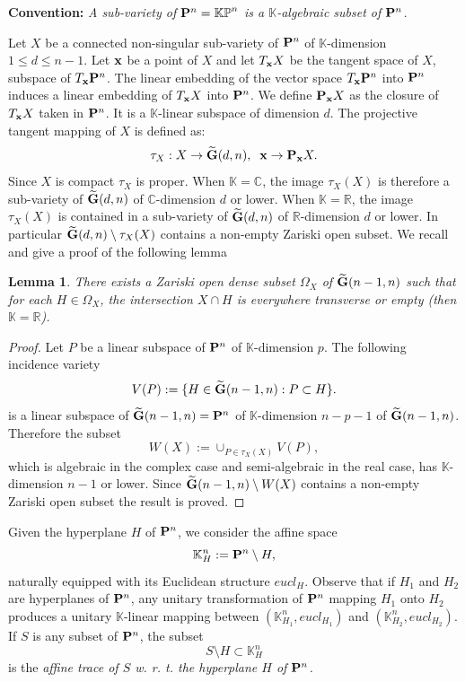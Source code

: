 \documentclass[11pt]{amsart}
\newtheorem{lemma}[theorem]{Lemma}
\newcommand{\field}[1]{\mathbb{#1}}
\newcommand{\C}{\field{C}}
\newcommand{\K}{\field{K}}
\newcommand{\R}{\field{R}}
\newcommand{\wt}[1]{\widetilde{#1}}
\newcommand{\bG}{{\bf G}}
\newcommand{\bP}{{\bf P}}
\newcommand{\bx}{{\bf x}}
\numberwithin{equation}{section}
\numberwithin{equation}{section}
\begin{document}
\bigskip\noindent
{\bf Convention:} \em A sub-variety of $\bP^n = \field{KP}^n$ is a 
$\K$-algebraic subset of $\bP^n$. 
\em

\bigskip
Let $X$ be a connected non-singular sub-variety of $\bP^n$ of $\K$-dimension
$1\leq d\leq n-1$. Let $\bx$ be a point of $X$ and let $T_\bx X$ be the 
tangent space of $X$, subspace of $T_\bx \bP^n$. The linear embedding of
the vector space $T_\bx \bP^n$ into $\bP^n$ induces a linear embedding of 
$T_\bx X$ into $\bP^n$. We define $\bP_\bx X$ as the closure of $T_\bx X$ 
taken in $\bP^n$. It is a $\K$-linear subspace of dimension $d$.
The projective tangent mapping of $X$ is defined as:
$$
\tau_X: X \to \wt{\bG}(d,n), \;\; \bx \to \bP_\bx X.
$$
Since $X$ is compact $\tau_X$ is proper. When $\K = \C$, the image 
$\tau_X(X)$ is therefore a sub-variety of $\wt{\bG}(d,n)$ of $\C$-dimension 
$d$ or lower. When $\K = \R$, the image $\tau_X(X)$ is contained in a 
sub-variety of $\wt{\bG}(d,n)$ of $\R$-dimension $d$ or lower.
In particular $\wt{\bG}(d,n) \setminus \tau_X(X)$ contains a non-empty 
Zariski open subset. We recall and give a proof of the following lemma
%
%
\begin{lemma}\label{lem:generic-cut}
There exists a Zariski open dense subset $\Omega_X$ of $\wt{\bG}(n-1,n)$
such that for each $H \in \Omega_X$, the intersection $X\cap H$ is everywhere 
transverse or empty (then $\K =\R$).
\end{lemma}
%
%
\begin{proof} 
Let $P$ be a linear subspace of $\bP^n$ of $\K$-dimension $p$. The 
following incidence variety
$$
V(P) := \{H\in \wt{\bG}(n-1,n) : P \subset H\}.
$$
is a linear subspace of $\wt{\bG}(n-1,n) = \bP^n$ of 
$\K$-dimension $n-p-1$ of $\wt{\bG}(n-1,n)$. Therefore the subset 
$$
W(X) :=  \cup_{P\in \tau_X(X)} V(P),
$$
which is algebraic in the complex case and semi-algebraic in the real case,
has $\K$-dimension $n-1$ or lower. 
Since $\wt{\bG}(n-1,n) \setminus W(X)$ contains a non-empty Zariski open
subset the result is proved.
\end{proof}
%
%
Given the hyperplane $H$ of $\bP^n$, we consider the affine space 
$$
\K_H^n := \bP^n \setminus H,
$$ 
naturally equipped with its Euclidean structure $eucl_H$. Observe that if 
$H_1$ and $H_2$ are hyperplanes of $\bP^n$, any unitary transformation of 
$\bP^n$ mapping $H_1$ onto $H_2$ produces a unitary $\K$-linear mapping 
between $(\K_{H_1}^n,eucl_{H_1})$ and $(\K_{H_2}^n,eucl_{H_2})$. 
If $S$ is any subset of $\bP^n$, the subset 
$$
S\setminus H \subset\K_H^n
$$
is the \em affine trace of $S$ w. r. t. the hyperplane $H$ of $\bP^n$. \em
\end{document}
